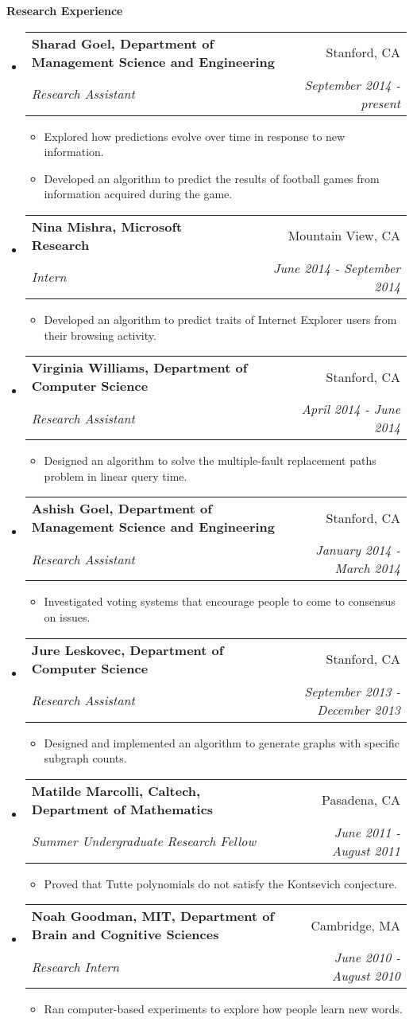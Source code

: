 \documentclass[letterpaper,11pt]{article}
\makeatletter
\newcommand{\resitem}[1]{\item #1 \vspace{-2pt}}
\newcommand{\resheading}[1]{{\large \colorbox{mygrey}{\begin{minipage}{\textwidth}{\textbf{#1 \vphantom{p\^{E}}}}\end{minipage}}}}
\newcommand{\ressubheading}[4]{
\begin{tabular*}{7.0in}{l@{\extracolsep{\fill}}r}
		\textbf{#1} & #2 \\
		\textit{#3} & \textit{#4}\\
\end{tabular*}\vspace{-6pt}}
\makeatother
\begin{document}
\resheading{Research Experience}
\begin{itemize}
\item
	\ressubheading{Sharad Goel, Department of Management Science and Engineering}{Stanford, CA}{Research Assistant}{September 2014 - present}
	\begin{itemize}
		\resitem{Explored how predictions evolve over time in response to new information.}
		\resitem{Developed an algorithm to predict the results of football games from information acquired during the game.}
	\end{itemize}
\item
	\ressubheading{Nina Mishra, Microsoft Research}{Mountain View, CA}{Intern}{June 2014 - September 2014}
	\begin{itemize}
		\resitem{Developed an algorithm to predict traits of Internet Explorer users from their browsing activity.}
	\end{itemize}
\item
	\ressubheading{Virginia Williams, Department of Computer Science}{Stanford, CA}{Research Assistant}{April 2014 - June 2014}
	\begin{itemize}
		\resitem{Designed an algorithm to solve the multiple-fault replacement paths problem in linear query time.}
	\end{itemize}
\item
	\ressubheading{Ashish Goel, Department of Management Science and Engineering}{Stanford, CA}{Research Assistant}{January 2014 - March 2014}
	\begin{itemize}
		\resitem{Investigated voting systems that encourage people to come to consensus on issues.}
	\end{itemize}
\item
	\ressubheading{Jure Leskovec, Department of Computer Science}{Stanford, CA}{Research Assistant}{September 2013 - December 2013}
	\begin{itemize}
		\resitem{Designed and implemented an algorithm to generate graphs with specific subgraph counts.}
	\end{itemize}
\item
	\ressubheading{Matilde Marcolli, Caltech, Department of Mathematics}{Pasadena, CA}{Summer Undergraduate Research Fellow}{June 2011 - August 2011}
	\begin{itemize}
		\resitem{Proved that Tutte polynomials do not satisfy the Kontsevich conjecture.}
	\end{itemize}
	
\item
	\ressubheading{Noah Goodman, MIT, Department of Brain and Cognitive Sciences}{Cambridge, MA}{Research Intern}{June 2010 - August 2010}
	\begin{itemize}
		\resitem{Ran computer-based experiments to explore how people learn new words.}
	\end{itemize}
	


\end{itemize}
\end{document}
